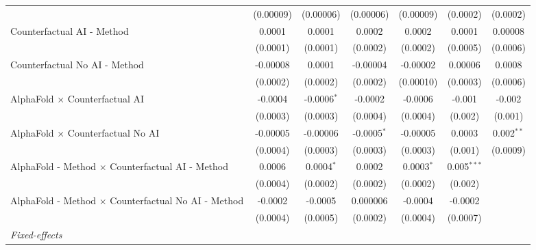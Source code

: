 \begin{tabular}{lcccccc}
                                                              & (0.00009)      & (0.00006)      & (0.00006)      & (0.00009)    & (0.0002)       & (0.0002)\\   
   Counterfactual AI - Method                                 & 0.0001         & 0.0001         & 0.0002         & 0.0002       & 0.0001         & 0.00008\\   
                                                              & (0.0001)       & (0.0001)       & (0.0002)       & (0.0002)     & (0.0005)       & (0.0006)\\   
   Counterfactual No AI - Method                              & -0.00008       & 0.0001         & -0.00004       & -0.00002     & 0.00006        & 0.0008\\   
                                                              & (0.0002)       & (0.0002)       & (0.0002)       & (0.00010)    & (0.0003)       & (0.0006)\\   
   AlphaFold $\times$ Counterfactual AI                       & -0.0004        & -0.0006$^{*}$  & -0.0002        & -0.0006      & -0.001         & -0.002\\   
                                                              & (0.0003)       & (0.0003)       & (0.0004)       & (0.0004)     & (0.002)        & (0.001)\\   
   AlphaFold $\times$ Counterfactual No AI                    & -0.00005       & -0.00006       & -0.0005$^{*}$  & -0.00005     & 0.0003         & 0.002$^{**}$\\   
                                                              & (0.0004)       & (0.0003)       & (0.0003)       & (0.0003)     & (0.001)        & (0.0009)\\   
   AlphaFold - Method $\times$ Counterfactual AI - Method     & 0.0006         & 0.0004$^{*}$   & 0.0002         & 0.0003$^{*}$ & 0.005$^{***}$  &   \\   
                                                              & (0.0004)       & (0.0002)       & (0.0002)       & (0.0002)     & (0.002)        &   \\   
   AlphaFold - Method $\times$ Counterfactual No AI - Method  & -0.0002        & -0.0005        & 0.000006       & -0.0004      & -0.0002        &   \\   
                                                              & (0.0004)       & (0.0005)       & (0.0002)       & (0.0004)     & (0.0007)       &   \\   
   \midrule
   \emph{Fixed-effects}\\

\end{tabular}
